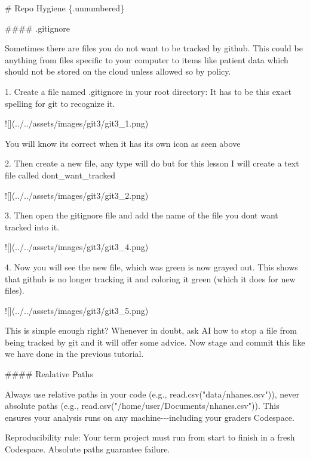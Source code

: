 \documentclass[
  letterpaper,
  DIV=11,
  numbers=noendperiod,
  oneside]{scrreprt}
\newenvironment{Shaded}{\begin{snugshade}}{\end{snugshade}}
\newcommand{\AlertTok}[1]{\textcolor[rgb]{0.68,0.00,0.00}{#1}}
\newcommand{\FunctionTok}[1]{\textcolor[rgb]{0.28,0.35,0.67}{#1}}
\newcommand{\InformationTok}[1]{\textcolor[rgb]{0.37,0.37,0.37}{#1}}
\newcommand{\NormalTok}[1]{\textcolor[rgb]{0.00,0.23,0.31}{#1}}
\newcommand{\SpecialStringTok}[1]{\textcolor[rgb]{0.13,0.47,0.30}{#1}}
\begin{document}
\begin{Shaded}
\begin{Highlighting}[numbers=left,,]
\FunctionTok{\# Repo Hygiene \{.unnumbered\}}


\FunctionTok{\#\#\#\# .gitignore}

\NormalTok{Sometimes there are files you do not want to be tracked by github. This could be anything from files specific to your computer to items like patient data which should not be stored on the cloud unless allowed so by policy.}

\SpecialStringTok{1.  }\NormalTok{Create a file named }\InformationTok{\textasciigrave{}.gitignore\textasciigrave{}}\NormalTok{ in your root directory: It has to be this exact spelling for git to recognize it.}

    \AlertTok{![](../../assets/images/git3/git3\_1.png)}

\NormalTok{    You will know its correct when it has its own icon as seen above}

\SpecialStringTok{2.  }\NormalTok{Then create a new file, any type will do but for this lesson I will create a text file called dont\_want\_tracked}

    \AlertTok{![](../../assets/images/git3/git3\_2.png)}

\SpecialStringTok{3.  }\NormalTok{Then open the gitignore file and add the name of the file you dont want tracked into it.}

    \AlertTok{![](../../assets/images/git3/git3\_4.png)}

\SpecialStringTok{4.  }\NormalTok{Now you will see the new file, which was green is now grayed out. This shows that github is no longer tracking it and coloring it green (which it does for new files).}

    \AlertTok{![](../../assets/images/git3/git3\_5.png)}

\NormalTok{This is simple enough right? Whenever in doubt, ask AI how to stop a file from being tracked by git and it will offer some advice. Now stage and commit this like we have done in the previous tutorial.}

\FunctionTok{\#\#\#\# Realative Paths}

\NormalTok{Always use relative paths in your code (e.g., read.csv("data/nhanes.csv")), never absolute paths (e.g., read.csv("/home/user/Documents/nhanes.csv")). This ensures your analysis runs on any machine{-}{-}{-}including your grader\textquotesingle{}s Codespace.}

\NormalTok{Reproducibility rule: Your term project must run from start to finish in a fresh Codespace. Absolute paths guarantee failure.}



\end{Highlighting}
\end{Shaded}
\end{document}
